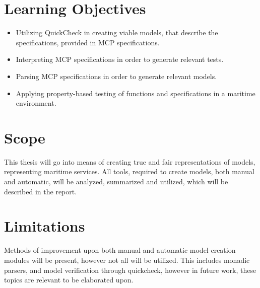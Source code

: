 \section{Learning Objectives}

\begin{itemize}
	\item Utilizing QuickCheck in creating viable models, that describe the specifications, provided in MCP specifications.
	\item Interpreting MCP specifications in order to generate relevant tests.
	\item Parsing MCP specifications in order to generate relevant models.
	\item Applying property-based testing of functions and specifications in a maritime environment.
\end{itemize}

\section{Scope}
This thesis will go into means of creating true and fair representations of models, representing maritime services. All tools, required to create models, both manual and automatic, will be analyzed, summarized and utilized, which will be described in the report.

\section{Limitations}
Methods of improvement upon both manual and automatic model-creation modules will be present, however not all will be utilized. This includes monadic parsers, and model verification through quickcheck, however in future work, these topics are relevant to be elaborated upon.

